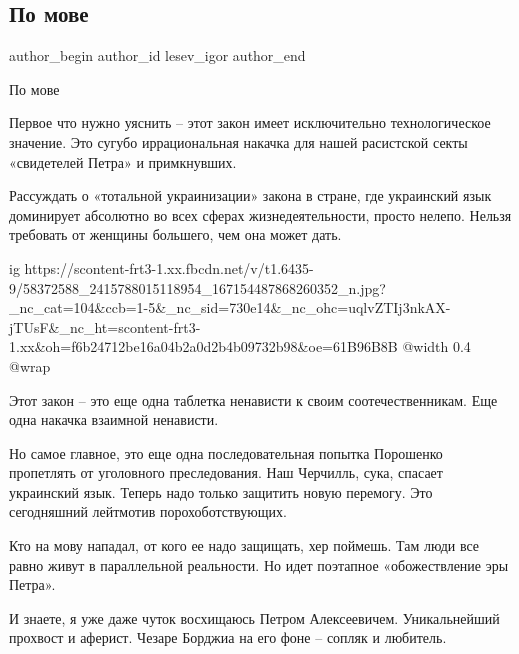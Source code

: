  
 
 
 
 
 
\subsection{По мове}
\label{sec:25_04_2019.fb.lesev_igor.1.po_move}
 
\ifcmt
 author_begin
   author_id lesev_igor
 author_end
\fi

По мове

Первое что нужно уяснить – этот закон имеет исключительно технологическое
значение. Это сугубо иррациональная накачка для нашей расистской секты
«свидетелей Петра» и примкнувших.

Рассуждать о «тотальной украинизации» закона в стране, где украинский язык
доминирует абсолютно во всех сферах жизнедеятельности, просто нелепо. Нельзя
требовать от женщины большего, чем она может дать.

\ifcmt
  ig https://scontent-frt3-1.xx.fbcdn.net/v/t1.6435-9/58372588_2415788015118954_167154487868260352_n.jpg?_nc_cat=104&ccb=1-5&_nc_sid=730e14&_nc_ohc=uqlvZTIj3nkAX-jTUsF&_nc_ht=scontent-frt3-1.xx&oh=f6b24712be16a04b2a0d2b4b09732b98&oe=61B96B8B
  @width 0.4
  @wrap 
\fi

Этот закон – это еще одна таблетка ненависти к своим соотечественникам. Еще
одна накачка взаимной ненависти.

Но самое главное, это еще одна последовательная попытка Порошенко пропетлять от
уголовного преследования. Наш Черчилль, сука, спасает украинский язык. Теперь
надо только защитить новую перемогу. Это сегодняшний лейтмотив
порохоботствующих.

Кто на мову нападал, от кого ее надо защищать, хер поймешь. Там люди все равно
живут в параллельной реальности. Но идет поэтапное «обожествление эры Петра».

И знаете, я уже даже чуток восхищаюсь Петром Алексеевичем. Уникальнейший
прохвост и аферист. Чезаре Борджиа на его фоне – сопляк и любитель.

